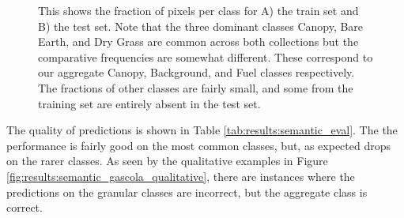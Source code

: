 \begin{figure}[h!]
   \centering
   \caption{This shows the fraction of pixels per class for A) the train set and B) the test set. Note that the three dominant classes Canopy, Bare Earth, and Dry Grass are common across both collections but the comparative frequencies are somewhat different. These correspond to our aggregate Canopy, Background, and Fuel classes respectively. The fractions of other classes are fairly small, and some from the training set are entirely absent in the test set.}
   \label{fig:results:semantic_class_fracs}                %
\end{figure}

The quality of predictions is shown in Table \ref{tab:results:semantic_eval}. The the performance is fairly good on the most common classes, but, as expected drops on the rarer classes. As seen by the qualitative examples in Figure \ref{fig:results:semantic_gascola_qualitative}, there are instances where the predictions on the granular classes are incorrect, but the aggregate class is correct.

